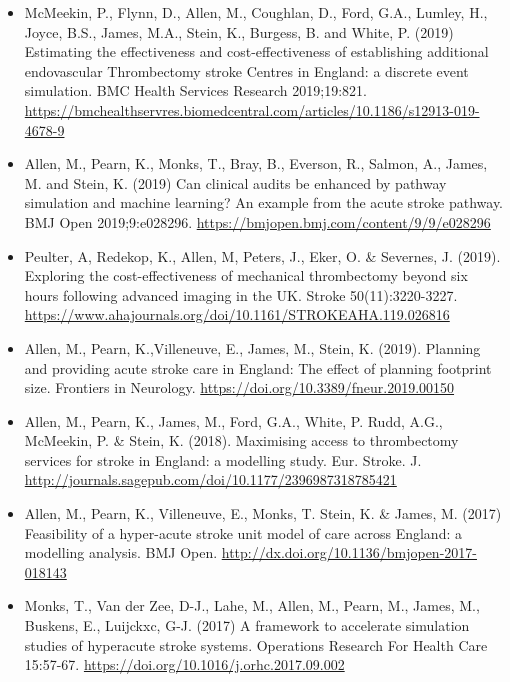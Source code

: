\begin{itemize}
    \item McMeekin, P., Flynn, D., Allen, M., Coughlan, D., Ford, G.A., Lumley, H., Joyce, B.S., James, M.A., Stein, K., Burgess, B. and White, P. (2019) Estimating the effectiveness and cost-effectiveness of establishing additional endovascular Thrombectomy stroke Centres in England: a discrete event simulation. BMC Health Services Research 2019;19:821. \url{https://bmchealthservres.biomedcentral.com/articles/10.1186/s12913-019-4678-9}

    \item Allen, M., Pearn, K., Monks, T., Bray, B., Everson, R., Salmon, A., James, M. and Stein, K. (2019) Can clinical audits be enhanced by pathway simulation and machine learning? An example from the acute stroke pathway. BMJ Open 2019;9:e028296. \url{https://bmjopen.bmj.com/content/9/9/e028296}

    \item Peulter, A, Redekop, K., Allen, M, Peters, J., Eker, O. \& Severnes, J. (2019). Exploring the cost-effectiveness of mechanical thrombectomy beyond six hours following advanced imaging in the UK. Stroke 50(11):3220-3227. \url{https://www.ahajournals.org/doi/10.1161/STROKEAHA.119.026816}

    \item Allen, M., Pearn, K.,Villeneuve, E., James, M., Stein, K. (2019). Planning and providing acute stroke care in England: The effect of planning footprint size. Frontiers in Neurology. \url{https://doi.org/10.3389/fneur.2019.00150}

    \item Allen, M., Pearn, K., James, M., Ford, G.A., White, P. Rudd, A.G., McMeekin, P. \& Stein, K. (2018). Maximising access to thrombectomy services for stroke in England: a modelling study. Eur. Stroke. J. \url{http://journals.sagepub.com/doi/10.1177/2396987318785421}

    \item Allen, M., Pearn, K., Villeneuve, E., Monks, T. Stein, K. \& James, M. (2017) Feasibility of a hyper-acute stroke unit model of care across England: a modelling analysis. BMJ Open. \url{http://dx.doi.org/10.1136/bmjopen-2017-018143}

    \item Monks, T., Van der Zee, D-J., Lahe, M., Allen, M., Pearn, M., James, M., Buskens, E., Luijckxc, G-J. (2017) A framework to accelerate simulation studies of hyperacute stroke systems. Operations Research For Health Care 15:57-67. \url{https://doi.org/10.1016/j.orhc.2017.09.002}

\end{itemize}


